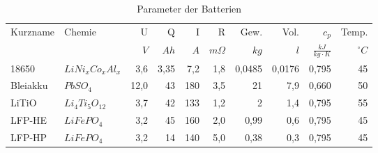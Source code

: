 \begin{table}\centering
	\begin{tabularx}{\textwidth}{XXrrrrrrrr}
		\toprule
		Kurzname & Chemie           & U   &    Q &   I &         R &   Gew. &   Vol. &                  $c_p$ &       Temp. \\
		         &                  & $V$ & $Ah$ & $A$ & $m\Omega$ &   $kg$ &    $l$ & $\frac{kJ}{kg\cdot K}$ & $^{\circ}C$ \\ \midrule
		18650    & $LiNi_xCo_xAl_x$ & 3,6 & 3,35 & 7,2 &       1,8 & 0,0485 & 0,0176 &                  0,795 &          45 \\
		Bleiakku & $PbSO_4$         & 12,0  &   43 & 180 &       3,5 &     21 &    7,9 &                  0,660 &          50 \\
		LiTiO    & $Li_4Ti_5O_{12}$ & 3,7 &   42 & 133 &       1,2 &      2 &    1,4 &                  0,795 &          55 \\
		LFP-HE   & $LiFePO_4$       & 3,2 &   45 & 160 &       2,0 &   0,99 &    0,6 &                  0,795 &          45 \\
		LFP-HP   & $LiFePO_4$       & 3,2 &   14 & 140 &       5,0 &   0,38 &    0,3 &                  0,795 &          45 \\ \bottomrule
	\end{tabularx}
	\caption{Parameter der Batterien}
	\label{vergleichstabellen_speichertechnologien}
\end{table}
